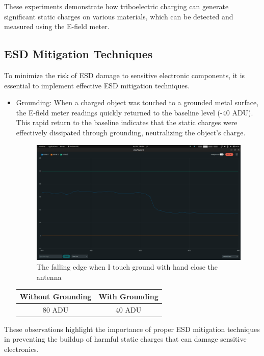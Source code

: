 \documentclass[a4paper,11pt]{article}%
\begin{document}
These experiments demonstrate how triboelectric charging can generate significant static charges on various materials, which can be detected and measured using the E-field meter.
\subsection{ESD Mitigation Techniques}
To minimize the risk of ESD damage to sensitive electronic components, it is essential to implement effective ESD mitigation techniques.
\begin{itemize}
  \item Grounding: When a charged object was touched to a grounded metal surface, the E-field meter readings quickly returned to the baseline level (-40 ADU). This rapid return to the baseline indicates that the static charges were effectively dissipated through grounding, neutralizing the object's charge.

        \begin{figure}[H]
          \centering
          \includegraphics[scale=0.2]{figures/hand_when_touching_groung.png}
          \caption{The falling edge when I touch ground with hand close the antenna}
        \end{figure}

        \begin{table}[H]
          \centering
          \begin{tabular}{|c|c|}
            \hline
            Without Grounding & With Grounding \\
            \hline
            80 ADU            & 40 ADU         \\
            \hline
          \end{tabular}
        \end{table}



\end{itemize}
These observations highlight the importance of proper ESD mitigation techniques in preventing the buildup of harmful static charges that can damage sensitive electronics.
\end{document}
